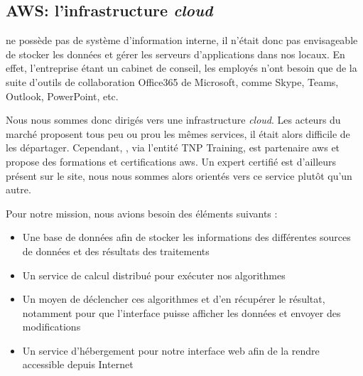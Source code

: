 


\newpage
\subsection{\textsc{AWS}: l'infrastructure \textit{cloud}}


\tnp ne possède pas de système d'information interne, il n'était donc pas envisageable de stocker les données et gérer les serveurs d'applications dans nos locaux.
En effet, l'entreprise étant un cabinet de conseil, les employés n'ont besoin que de la suite d'outils de collaboration Office365 de Microsoft, comme Skype, Teams, Outlook, PowerPoint, etc.

Nous nous sommes donc dirigés vers une infrastructure \textit{cloud}. Les acteurs du marché proposent tous peu ou prou les mêmes services, il était alors difficile de les départager. Cependant, \tnp, via l'entité \textsc{TNP} Training, est partenaire \gls{aws}\cite{noauthor_tnp_nodate} et propose des formations et certifications \gls{aws}. Un expert certifié est d'ailleurs présent sur le site, nous nous sommes alors orientés vers ce service plutôt qu'un autre.

Pour notre mission, nous avions besoin des éléments suivants :

\begin{itemize}
    \item Une base de données afin de stocker les informations des différentes sources de données \sncf et des résultats des traitements
    \item Un service de calcul distribué pour exécuter nos algorithmes
    \item Un moyen de déclencher ces algorithmes et d'en récupérer le résultat, notamment pour que l'interface puisse afficher les données et envoyer des modifications
    \item Un service d'hébergement pour notre interface web afin de la rendre accessible depuis Internet
\end{itemize}

